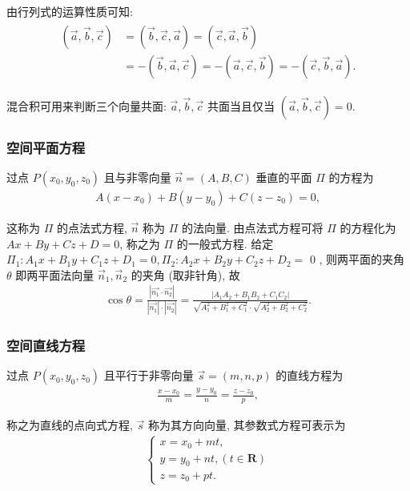 由行列式的运算性质可知:
\begin{align*}
	\begin{aligned}
		{(\vec{a}, \vec{b}, \vec{c}) } & =(\vec{b}, \vec{c}, \vec{a})=(\vec{c}, \vec{a}, \vec{b})                                  \\
		                               & =-(\vec{b}, \vec{a}, \vec{c})=-(\vec{a}, \vec{c}, \vec{b})=-(\vec{c}, \vec{b}, \vec{a}) .
	\end{aligned}
\end{align*}

混合积可用来判断三个向量共面: $\vec{a}, \vec{b}, \vec{c}$ 共面当且仅当 $(\vec{a}, \vec{b}, \vec{c})=0$.

\subsubsection{空间平面方程}
过点 $P\left(x_0, y_0, z_0\right)$ 且与非零向量 $\vec{n}=(A, B, C)$ 垂直的平面 $\Pi$ 的方程为
\begin{align*}
	A\left(x-x_0\right)+B\left(y-y_0\right)+C\left(z-z_0\right)=0,
\end{align*}

这称为 $\Pi$ 的点法式方程, $\vec{n}$ 称为 $\Pi$ 的法向量.
由点法式方程可将 $\Pi$ 的方程化为 $A x+B y+C z+D=0$, 称之为 $\Pi$ 的一般式方程. 给定 $\Pi_1: A_1 x+B_1 y+C_1 z+D_1=0, \Pi_2: A_2 x+B_2 y+C_2 z+D_2=$ 0 , 则两平面的夹角 $\theta$ 即两平面法向量 $\vec{n}_1, \vec{n}_2$ 的夹角 (取非针角), 故
\begin{align*}
	\cos \theta=\frac{\left|\overrightarrow{n_1} \cdot \overrightarrow{n_2}\right|}{\left|\overrightarrow{n_1}\right| \cdot\left|\overrightarrow{n_2}\right|}=\frac{\left|A_1 A_2+B_1 B_2+C_1 C_2\right|}{\sqrt{A_1^2+B_1^2+C_1^2} \cdot \sqrt{A_2^2+B_2^2+C_2^2}} .
\end{align*}

\subsubsection{空间直线方程}
过点 $P\left(x_0, y_0, z_0\right)$ 且平行于非零向量 $\vec{s}=(m, n, p)$ 的直线方程为
\begin{align*}
	\frac{x-x_0}{m}=\frac{y-y_0}{n}=\frac{z-z_0}{p},
\end{align*}

称之为直线的点向式方程, $\vec{s}$ 称为其方向向量, 其参数式方程可表示为
\begin{align*}
	\left\{\begin{array}{l}
		       x=x_0+m t,                   \\
		       y=y_0+n t,(t \in \mathbf{R}) \\
		       z=z_0+p t .
	       \end{array}\right.
\end{align*}

